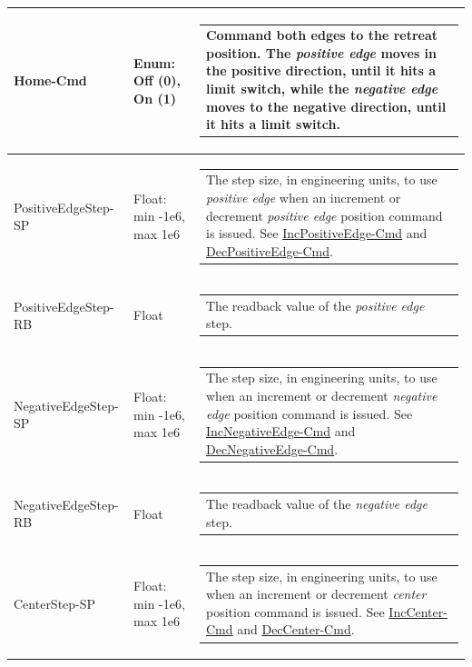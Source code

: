 \documentclass[openany]{article}
\begin{document}
\begin{longtable}{| m{4.5cm} m{2.5cm}  m{7.0cm} |}
        Home-Cmd & Enum: Off (0), On (1) & \begin{tabular}{@{}m{6cm}@{}}
                Command both edges to the retreat position. The \emph{positive edge} moves in the positive direction, until it hits a limit switch, while the \emph{negative edge} moves to the negative direction, until it hits a limit switch.
            \end{tabular} \hypertarget{pv:positive-edge-step}{}\\ \hline
        PositiveEdgeStep-SP & Float: min -1e6, max 1e6 & \begin{tabular}{@{}m{6cm}@{}}
                The step size, in engineering units, to use \emph{positive edge} when an increment or decrement \emph{positive edge} position command is issued. See \hyperlink{pv:inc-positive-edge-cmd}{IncPositiveEdge-Cmd} and \hyperlink{pv:dec-positive-edge-cmd}{DecPositiveEdge-Cmd}.
            \end{tabular} \hypertarget{}{}\\ \hline
        PositiveEdgeStep-RB & Float & \begin{tabular}{@{}m{6cm}@{}}
                The readback value of the \emph{positive edge} step.
            \end{tabular} \hypertarget{pv:negative-edge-step}{}\\ \hline
        NegativeEdgeStep-SP & Float: min -1e6, max 1e6 & \begin{tabular}{@{}m{6cm}@{}}
                The step size, in engineering units, to use when an increment or decrement \emph{negative edge} position command is issued. See \hyperlink{pv:inc-negative-edge-cmd}{IncNegativeEdge-Cmd} and \hyperlink{pv:dec-negative-edge-cmd}{DecNegativeEdge-Cmd}.
            \end{tabular} \hypertarget{}{}\\ \hline
        NegativeEdgeStep-RB & Float & \begin{tabular}{@{}m{6cm}@{}}
                The readback value of the \emph{negative edge} step.
            \end{tabular} \hypertarget{pv:center-step}{}\\ \hline
        CenterStep-SP & Float: min -1e6, max 1e6 & \begin{tabular}{@{}m{6cm}@{}}
                The step size, in engineering units, to use when an increment or decrement \emph{center} position command is issued. See \hyperlink{pv:inc-center-cmd}{IncCenter-Cmd} and \hyperlink{pv:dec-center-cmd}{DecCenter-Cmd}.

\end{tabular}
\end{longtable}
\end{document}

